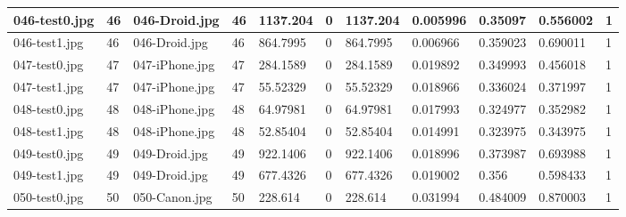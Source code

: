 \begin{landscape}
\begin{longtable}{|p{2cm}|p{1cm}|p{2cm}|p{1cm}|p{2cm}|p{1cm}|p{2cm}|p{2cm}|p{2cm}|p{2cm}|p{1cm}|}
	046-test0.jpg   & 46               & 046-Droid.jpg         & 46                          & 1137.204              & 0                       & 1137.204                   & 0.005996              & 0.35097               & 0.556002                 & 1                \\ \hline
	046-test1.jpg   & 46               & 046-Droid.jpg         & 46                          & 864.7995              & 0                       & 864.7995                   & 0.006966              & 0.359023              & 0.690011                 & 1                \\ \hline
	047-test0.jpg   & 47               & 047-iPhone.jpg        & 47                          & 284.1589              & 0                       & 284.1589                   & 0.019892              & 0.349993              & 0.456018                 & 1                \\ \hline
	047-test1.jpg   & 47               & 047-iPhone.jpg        & 47                          & 55.52329              & 0                       & 55.52329                   & 0.018966              & 0.336024              & 0.371997                 & 1                \\ \hline
	048-test0.jpg   & 48               & 048-iPhone.jpg        & 48                          & 64.97981              & 0                       & 64.97981                   & 0.017993              & 0.324977              & 0.352982                 & 1                \\ \hline
	048-test1.jpg   & 48               & 048-iPhone.jpg        & 48                          & 52.85404              & 0                       & 52.85404                   & 0.014991              & 0.323975              & 0.343975                 & 1                \\ \hline
	049-test0.jpg   & 49               & 049-Droid.jpg         & 49                          & 922.1406              & 0                       & 922.1406                   & 0.018996              & 0.373987              & 0.693988                 & 1                \\ \hline
	049-test1.jpg   & 49               & 049-Droid.jpg         & 49                          & 677.4326              & 0                       & 677.4326                   & 0.019002              & 0.356                 & 0.598433                 & 1                \\ \hline
	050-test0.jpg   & 50               & 050-Canon.jpg         & 50                          & 228.614               & 0                       & 228.614                    & 0.031994              & 0.484009              & 0.870003                 & 1                \\ \hline

\end{longtable}
\end{landscape}
